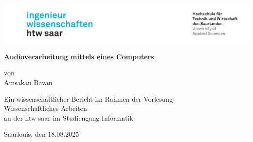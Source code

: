 \begin{titlepage}

\linespread{1.5}

\includegraphics[width=\linewidth]{graphics/htw_logo}

\begin{center}
    \large  
    \hfill
    \vfill
    \Large{\bfseries{Audioverarbeitung mittels eines Computers}}
    
    von \\
    Amsakan Bavan

    \vfill
		
    Ein wissenschaftlicher Bericht im Rahmen der Vorlesung\\
    \glqq Wissenschaftliches Arbeiten\grqq\\
    an der htw saar im Studiengang Informatik\\
	
    \vfill	
    \vfill
	
    Saarlouis, den 18.08.2025
\end{center}
    
\end{titlepage}
